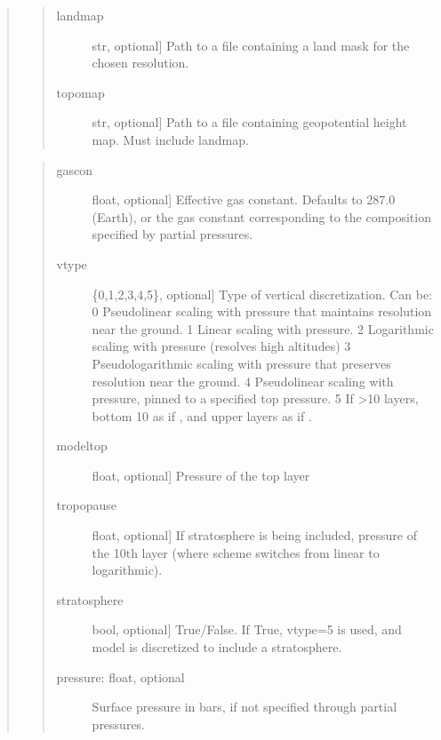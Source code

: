\documentclass[letterpaper,10pt,english]{sphinxmanual}
\begin{document}
\begin{fulllineitems}
\begin{fulllineitems}
\begin{quote}
\begin{quote}
\begin{description}
\item[{landmap}] \leavevmode{[}str, optional{]}
Path to a  file containing a land mask for the chosen resolution.

\item[{topomap}] \leavevmode{[}str, optional{]}
Path to a  file containing geopotential height map. Must include landmap.

\end{description}
\end{quote}

\begin{quote}
\begin{description}
\item[{gascon}] \leavevmode{[}float, optional{]}
Effective gas constant. Defaults to 287.0 (Earth), or the gas constant
corresponding to the composition specified by partial pressures.

\item[{vtype}] \leavevmode{[}\{0,1,2,3,4,5\}, optional{]}
Type of vertical discretization. Can be:
0   Pseudolinear scaling with pressure that maintains resolution near the ground.
1   Linear scaling with pressure.
2   Logarithmic scaling with pressure (resolves high altitudes)
3   Pseudologarithmic scaling with pressure that preserves resolution near the ground.
4   Pseudolinear scaling with pressure, pinned to a specified top pressure.
5   If \textgreater{}10 layers, bottom 10 as if , and upper layers as if .

\item[{modeltop}] \leavevmode{[}float, optional{]}
Pressure of the top layer

\item[{tropopause}] \leavevmode{[}float, optional{]}
If stratosphere is being included, pressure of the 10th layer (where scheme
switches from linear to logarithmic).

\item[{stratosphere}] \leavevmode{[}bool, optional{]}
True/False. If True, vtype=5 is used, and model is discretized to include
a stratosphere.

\item[{pressure: float, optional}] \leavevmode
Surface pressure in bars, if not specified through partial pressures.

\end{description}
\end{quote}


\end{quote}
\end{fulllineitems}
\end{fulllineitems}
\end{document}

